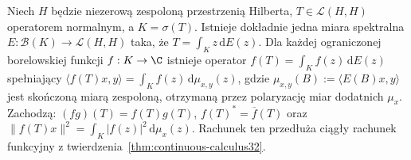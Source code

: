 \begin{twierdzenie}
\label{thm:spectral-normal32}
Niech $H$ będzie niezerową zespoloną przestrzenią Hilberta,
$T\in\mathcal L(H,H)$ operatorem normalnym, a $K=\sigma(T)$.
Istnieje dokładnie jedna miara spektralna
$E:\mathcal B(K)\to\mathcal L(H,H)$ taka, że
$T=\int_Kz\,\mathrm dE(z)$.
Dla każdej ograniczonej borelowskiej funkcji $f:K\to\C$
istnieje operator $f(T)=\int_K f(z)\,\mathrm dE(z)$ spełniający
$\langle f(T)x,y\rangle=\int_K f(z)\,\mathrm d\mu_{x,y}(z)$,
gdzie $\mu_{x,y}(B):=\langle E(B)x,y\rangle$
jest skończoną miarą zespoloną, otrzymaną przez
polaryzację miar dodatnich $\mu_x$.
Zachodzą: $(fg)(T)=f(T)g(T)$,
$f(T)^*=\overline f(T)$ oraz
$\|f(T)x\|^2=\int_K|f(z)|^2\,\mathrm d\mu_x(z)$.
Rachunek ten przedłuża ciągły rachunek funkcyjny z
twierdzenia~\ref{thm:continuous-calculus32}.
\end{twierdzenie}
